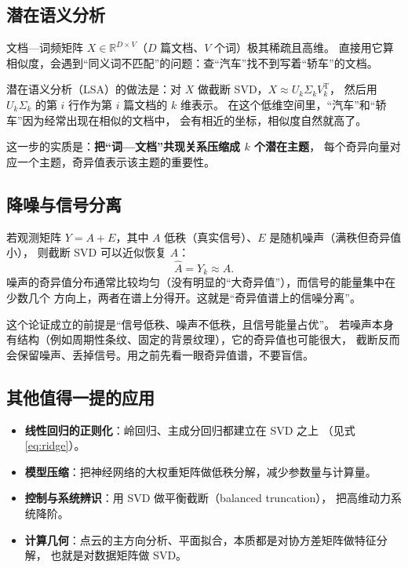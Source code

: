 \documentclass[UTF8, 11pt, a4paper, fontset=windows]{ctexart}
\theoremstyle{cnthm}
\theoremstyle{cndef}
\newcommand{\T}{^{\mathrm{T}}}
\newcommand{\R}{\mathbb{R}}
\begin{document}
\subsection{潜在语义分析}

文档—词频矩阵 $X\in\R^{D\times V}$（$D$ 篇文档、$V$ 个词）极其稀疏且高维。
直接用它算相似度，会遇到“同义词不匹配”的问题：查“汽车”找不到写着“轿车”的文档。

潜在语义分析（LSA）的做法是：对 $X$ 做截断 SVD，$X\approx U_k\Sigma_kV_k\T$，
然后用 $U_k\Sigma_k$ 的第 $i$ 行作为第 $i$ 篇文档的 $k$ 维表示。
在这个低维空间里，“汽车”和“轿车”因为经常出现在相似的文档中，
会有相近的坐标，相似度自然就高了。

这一步的实质是：\textbf{把“词—文档”共现关系压缩成 $k$ 个潜在主题}，
每个奇异向量对应一个主题，奇异值表示该主题的重要性。

\subsection{降噪与信号分离}

若观测矩阵 $Y=A+E$，其中 $A$ 低秩（真实信号）、$E$ 是随机噪声（满秩但奇异值小），
则截断 SVD 可以近似恢复 $A$：
\begin{equation}
  \hat{A}=Y_k\approx A .
\end{equation}
噪声的奇异值分布通常比较均匀（没有明显的“大奇异值”），而信号的能量集中在少数几个
方向上，两者在谱上分得开。这就是“奇异值谱上的信噪分离”。

\begin{warnbox}[降噪的边界]
这个论证成立的前提是“信号低秩、噪声不低秩，且信号能量占优”。
若噪声本身有结构（例如周期性条纹、固定的背景纹理），它的奇异值也可能很大，
截断反而会保留噪声、丢掉信号。用之前先看一眼奇异值谱，不要盲信。
\end{warnbox}

\subsection{其他值得一提的应用}

\begin{itemize}
  \item \textbf{线性回归的正则化}：岭回归、主成分回归都建立在 SVD 之上
        （见式 \eqref{eq:ridge}）。
  \item \textbf{模型压缩}：把神经网络的大权重矩阵做低秩分解，减少参数量与计算量。
  \item \textbf{控制与系统辨识}：用 SVD 做平衡截断（balanced truncation），
        把高维动力系统降阶。
  \item \textbf{计算几何}：点云的主方向分析、平面拟合，本质都是对协方差矩阵做特征分解，
        也就是对数据矩阵做 SVD。
\end{itemize}
\end{document}
